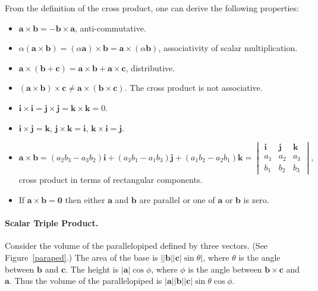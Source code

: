 From the definition of the cross product, one can derive the following 
properties:
\begin{itemize}
\item
$\mathbf{a} \times \mathbf{b} = - \mathbf{b} \times \mathbf{a}$, 
anti-commutative.
\item
$\alpha ( \mathbf{a} \times \mathbf{b} ) =
( \alpha \mathbf{a} ) \times \mathbf{b} =
\mathbf{a} \times ( \alpha \mathbf{b} )$, associativity of scalar 
multiplication.
\item
$\mathbf{a} \times ( \mathbf{b} + \mathbf{c} ) = 
\mathbf{a} \times \mathbf{b} + \mathbf{a} \times \mathbf{c}$,
distributive.
\item
$( \mathbf{a} \times \mathbf{b} ) \times \mathbf{c} \neq
\mathbf{a} \times ( \mathbf{b} \times \mathbf{c} )$.  The cross 
product is not associative.
\item
$ \mathbf{i} \times \mathbf{i} = \mathbf{j} \times \mathbf{j} =
\mathbf{k} \times \mathbf{k} = 0$.
\item
$ \mathbf{i} \times \mathbf{j} = \mathbf{k}$, 
$\mathbf{j} \times \mathbf{k} = \mathbf{i}$,
$\mathbf{k} \times \mathbf{i} = \mathbf{j}$.
\item
\[
\mathbf{a} \times \mathbf{b} = 
(a_2 b_3 - a_3 b_2) \mathbf{i} + (a_3 b_1 - a_1 b_3) \mathbf{j}
+ (a_1 b_2 - a_2 b_1) \mathbf{k} =
\begin{vmatrix}
\mathbf{i} & \mathbf{j} & \mathbf{k} \\
a_1 & a_2 & a_3 \\
b_1 & b_2 & b_3
\end{vmatrix},
\]
cross product in terms of rectangular components.
\item
If $\mathbf{a} \times \mathbf{b} = \mathbf{0}$ then either $\mathbf{a}$ and 
$\mathbf{b}$ are parallel or one of $\mathbf{a}$ or $\mathbf{b}$ is zero.
\end{itemize}









\paragraph{Scalar Triple Product.}
Consider the volume of the parallelopiped defined by three vectors.
(See Figure~\ref{paraped}.)
The area of the base is $\left| |\mathbf{b}| |\mathbf{c}| \sin \theta \right|$, 
where $\theta$
is the angle between $\mathbf{b}$ and $\mathbf{c}$.  The height is
$| \mathbf{a} | \cos \phi$, where $\phi$ is the angle between
$\mathbf{b} \times \mathbf{c}$ and $\mathbf{a}$.  Thus the volume of 
the parallelopiped is 
$|\mathbf{a}| |\mathbf{b}| |\mathbf{c}| \sin \theta \cos \phi$.

